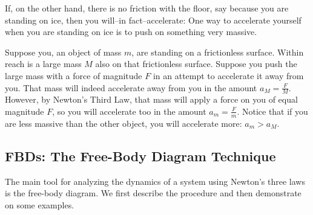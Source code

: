 If, on the other hand, there is no friction with the floor, say because you are standing on ice, then you will--in fact--accelerate: One way to accelerate yourself when you are standing on ice is to push on something very massive. 

Suppose you, an object of mass $m$, are standing on a frictionless surface. Within reach is a large mass $M$ also on that frictionless surface. Suppose you push the large mass with a force of magnitude $F$ in an attempt to accelerate it away from you. That mass will indeed accelerate away from you in the amount $a_M= \frac FM$. However, by Newton's Third Law, that mass will apply a force on you of equal magnitude $F$, so you will accelerate too in the amount $a_m = \frac Fm$. Notice that if you are less massive than the other object, you will accelerate more: $a_m > a_M$. 

\subsection{FBDs: The Free-Body Diagram Technique}

The main tool for analyzing the dynamics of a system using Newton's three laws is the free-body diagram. We first describe the procedure and then demonstrate on some examples. 

